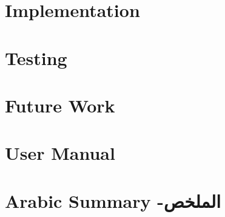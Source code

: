 \documentclass[12pt,twoside]{report}
\begin{document}
	\chapter{Implementation}
	
	
	\chapter{Testing}
	
	
	\chapter{Future Work}
	
	
	
	\appendix
	\chapter{User Manual}
	
	
	\renewcommand{\bibname}{References}
	\printbibliography
	
	\chapter{Arabic Summary -\textarabic[utf]{الملخص}}
	
\end{document}
